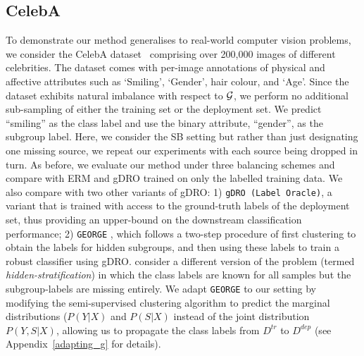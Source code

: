 
\subsection{CelebA}\label{ssec:celeba_exp}
%

%
To demonstrate our method generalises to real-world computer vision problems, we consider the
CelebA dataset~\citep{liu2015celeba} comprising over 200,000 images of different celebrities. The
dataset comes with per-image annotations of physical and affective attributes such as `Smiling',
`Gender', hair colour, and `Age'.
%
Since the dataset exhibits natural imbalance with respect to ${\mathcal{G}}$, we perform no additional
sub-sampling of either the training set or the deployment set. We predict ``smiling'' as the class
label and use the binary attribute, ``gender'', as the subgroup label. Here, we consider the SB
setting but rather than just designating one missing source, we repeat our experiments with each
source being dropped in turn.
%
As before, we evaluate our method under three balancing schemes and compare with ERM and gDRO
trained on only the labelled training data.
%
We also compare with two other variants of gDRO: 1) \texttt{gDRO (Label Oracle)}, a variant that is
trained with access to the ground-truth labels of the deployment set, thus providing an upper-bound
on the downstream classification performance; 2) \texttt{GEORGE} \citep{SohDunAngGuetal20}, which
follows a two-step procedure of first clustering to obtain the labels for hidden subgroups, and
then using these labels to train a robust classifier using gDRO.
%
\citet{SohDunAngGuetal20} consider a different version of the problem (termed
\emph{hidden-stratification}) in which the class labels are known for all samples but the
subgroup-labels are missing entirely.
%
We adapt \texttt{GEORGE} to our setting by modifying the semi-supervised clustering algorithm to
predict the marginal distributions (\(P(Y|X)\) and \(P(S|X)\) instead of the joint distribution
\(P(Y, S|X)\), allowing us to propagate the class labels from \( D^{tr} \) to \( D^{dep} \) (see
Appendix~\ref{adapting_g} for details).


